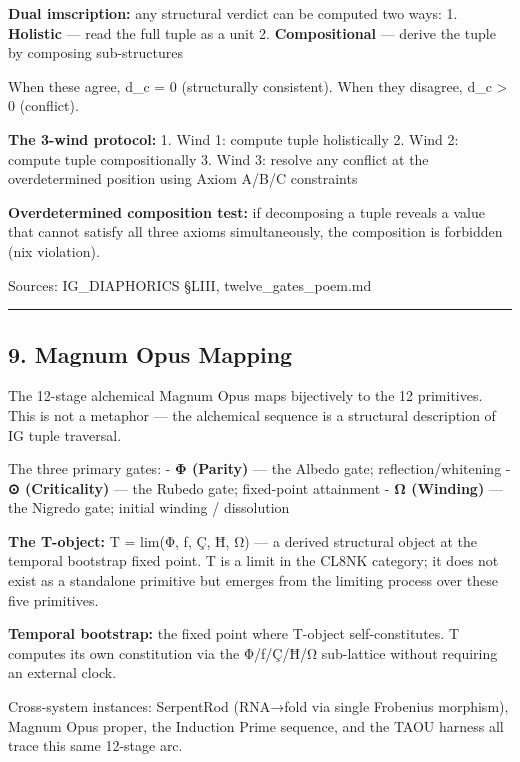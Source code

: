 \textbf{Dual imscription:} any structural verdict can be computed two
ways: 1. \textbf{Holistic} --- read the full tuple as a unit 2.
\textbf{Compositional} --- derive the tuple by composing sub-structures

When these agree, d\_c = 0 (structurally consistent). When they
disagree, d\_c \textgreater{} 0 (conflict).

\textbf{The 3-wind protocol:} 1. Wind 1: compute tuple holistically 2.
Wind 2: compute tuple compositionally 3. Wind 3: resolve any conflict at
the overdetermined position using Axiom A/B/C constraints

\textbf{Overdetermined composition test:} if decomposing a tuple reveals
a value that cannot satisfy all three axioms simultaneously, the
composition is forbidden (nix violation).

Sources: IG\_DIAPHORICS §LIII, twelve\_gates\_poem.md

\begin{center}\rule{0.5\linewidth}{0.5pt}\end{center}

\hypertarget{magnum-opus-mapping}{%
\subsection{9. Magnum Opus Mapping}\label{magnum-opus-mapping}}

The 12-stage alchemical Magnum Opus maps bijectively to the 12
primitives. This is not a metaphor --- the alchemical sequence is a
structural description of IG tuple traversal.

The three primary gates: - \textbf{Φ (Parity)} --- the Albedo gate;
reflection/whitening - \textbf{⊙ (Criticality)} --- the Rubedo gate;
fixed-point attainment - \textbf{Ω (Winding)} --- the Nigredo gate;
initial winding / dissolution

\textbf{The T-object:} T = lim(Φ, ƒ, Ç, Ħ, Ω) --- a derived structural
object at the temporal bootstrap fixed point. T is a limit in the CL8NK
category; it does not exist as a standalone primitive but emerges from
the limiting process over these five primitives.

\textbf{Temporal bootstrap:} the fixed point where T-object
self-constitutes. T computes its own constitution via the Φ/ƒ/Ç/Ħ/Ω
sub-lattice without requiring an external clock.

Cross-system instances: SerpentRod (RNA→fold via single Frobenius
morphism), Magnum Opus proper, the Induction Prime sequence, and the
TAOU harness all trace this same 12-stage arc.

